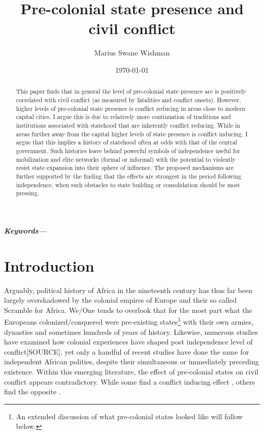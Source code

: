 \documentclass[12pt]{article}
\title{Pre-colonial state presence and civil conflict}
\author[1]{Marius Swane Wishman}
\affil[1]{Department of Sociology and Political Science, NTNU}
\date{\today}
\providecommand{\keywords}[1]
{
	\small	
	\textbf{\textit{Keywords---}} #1
}
\begin{document}
\maketitle

\begin{abstract}

This paper finds that in general the level of pre-colonial state presence are is
positively correlated with civil conflict (as measured by fatalities and
conflict onsets). However, higher levels of pre-colonial state presence is
conflict reducing in areas close to modern capital cities. I argue this is due
to relatively more continuation of traditions and institutions associated with
statehood that are inherently conflict reducing. While in areas further away
from the capital higher levels of state presence is conflict inducing. I argue
that this implies a history of statehood often at odds with that of the central
government. Such histories leave behind powerful symbols of independence useful
for mobilization and elite networks (formal or informal) with the potential to
violently resist state expansion into their sphere of influence. The proposed
mechanisms are further supported by the finding that the effects are strongest
in the period following independence, when such obstacles to state building or
consolidation should be most pressing.

\end{abstract}

\keywords{}


\onehalfspacing


\newpage

\section{Introduction}

Arguably, political history of Africa in the nineteenth century has thus far
been largely overshadowed by the colonial empires of Europe and their so called
Scramble for Africa. We/One tends to overlook that for the most part what the
Europeans colonized/conquered were pre-existing states\footnote{An extended
discussion of what pre-colonial states looked like will follow below.} with
their own armies, dynasties and sometimes hundreds of years of history.
Likewise, numerous studies have examined how colonial experiences have shaped
post independence level of conflict[SOURCE], yet only a handful of recent
studies have done the same for independent African polities, despite their
simultaneous or immediately preceding existence. Within this emerging
literature, the effect of pre-colonial states on civil conflict appears
contradictory. %
While some find a conflict inducing effect \citep{Englebert2002, Paine2019},
others find the opposite \citep{Depetris-Chauvin2016, Wig2016}.
\end{document}
